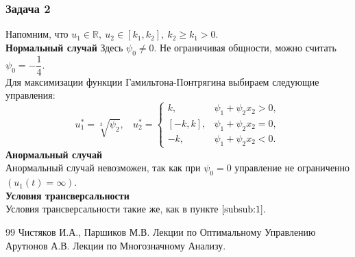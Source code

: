 \documentclass{article}
\begin{document}
\subsubsection{Задача 2}
Напомним, что $u_1 \in \mathbb{R}, ~u_2\in[k_1, k_2], ~k_2\geqslant k_1 >0.$\\
\textbf{Нормальный случай}
Здесь $\psi_0\neq0.$ Не ограничивая общности, можно считать $\psi_0 = -\dfrac{1}{4}.$\\
Для максимизации функции Гамильтона-Понтрягина выбираем следующие управления:
$$
u_1^* = 
\sqrt[3]{\psi_2},
~~~~
u_2^* = 
\begin{cases}
    k, & \psi_1 + \psi_2 x_2 > 0, \\
    [-k, k], & \psi_1 + \psi_2 x_2 = 0, \\
    -k, & \psi_1 + \psi_2 x_2 < 0.
\end{cases}
$$
\textbf{Анормальный случай}\\
Анормальный случай невозможен, так как при $\psi_0= 0$ управление не ограниченно $(u_1(t) = \infty).$\\
\textbf{Условия трансверсальности}\\
Условия трансверсальности такие же, как в пункте $\ref{subsub:1}.$
\newpage
\begin{thebibliography}{99}
 Чистяков И.А., Паршиков М.В. Лекции по Оптимальному Управлению
 Арутюнов А.В. Лекции по Многозначному Анализу.
\end{thebibliography}
\end{document}
